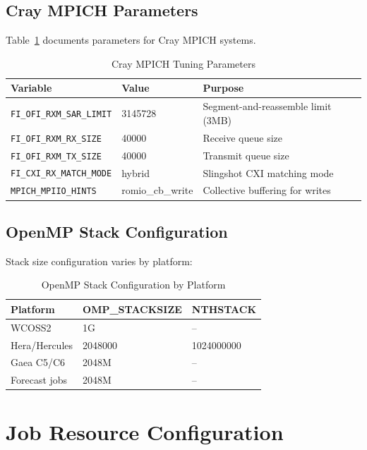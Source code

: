 \documentclass[11pt,a4paper,twoside]{article}
\begin{document}
\subsection{Cray MPICH Parameters}

Table~\ref{tab:craympich} documents parameters for Cray MPICH systems.

\begin{table}[H]
\centering
\caption{Cray MPICH Tuning Parameters}
\label{tab:craympich}
\begin{tabular}{@{}llp{6cm}@{}}
\toprule
\textbf{Variable} & \textbf{Value} & \textbf{Purpose} \\
\midrule
\texttt{FI\_OFI\_RXM\_SAR\_LIMIT} & 3145728 & Segment-and-reassemble limit (3MB) \\
\texttt{FI\_OFI\_RXM\_RX\_SIZE} & 40000 & Receive queue size \\
\texttt{FI\_OFI\_RXM\_TX\_SIZE} & 40000 & Transmit queue size \\
\texttt{FI\_CXI\_RX\_MATCH\_MODE} & hybrid & Slingshot CXI matching mode \\
\texttt{MPICH\_MPIIO\_HINTS} & romio\_cb\_write & Collective buffering for writes \\
\bottomrule
\end{tabular}
\end{table}

\subsection{OpenMP Stack Configuration}

Stack size configuration varies by platform:

\begin{table}[H]
\centering
\caption{OpenMP Stack Configuration by Platform}
\label{tab:stack}
\begin{tabular}{@{}lll@{}}
\toprule
\textbf{Platform} & \textbf{OMP\_STACKSIZE} & \textbf{NTHSTACK} \\
\midrule
WCOSS2 & 1G & -- \\
Hera/Hercules & 2048000 & 1024000000 \\
Gaea C5/C6 & 2048M & -- \\
Forecast jobs & 2048M & -- \\
\bottomrule
\end{tabular}
\end{table}

\section{Job Resource Configuration}
\label{sec:resources}
\end{document}
